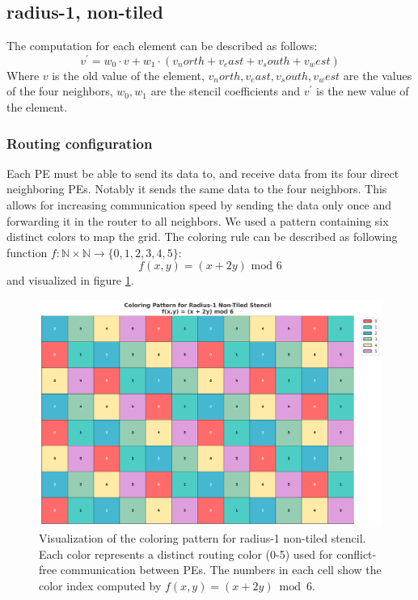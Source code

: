 \documentclass{article}
\newcommand{\m}{\text{ mod }}
\begin{document}
\subsection{radius-1, non-tiled}
The computation for each element can be described as follows:
\begin{equation}
    \label{eq:stencil_computation}
    v^' = w_0 \cdot v + w_1 \cdot (v_north + v_east + v_south + v_west)
\end{equation}
Where $v$ is the old value of the element, $v_north, v_east, v_south, v_west$ are the values of the four neighbors, $w_0, w_1$ are the stencil coefficients and $v^'$ is the new value of the element.

\subsubsection{Routing configuration}
Each PE must be able to send its data to, and receive data from its four direct neighboring PEs. Notably it sends the same data to the four neighbors. This allows for increasing communication speed by sending the data only once and forwarding it in the router to all neighbors. We used a pattern containing six distinct colors to map the grid.
The coloring rule can be described as following function $f:\mathbb{N}\times\mathbb{N}\to\{0,1,2,3,4,5\}$:
\begin{equation}
    \label{eq:coloring_function}
    f(x,y) = (x + 2y) \m 6
\end{equation}
and visualized in figure \ref{fig:r1_stencil_coloring}.
\begin{figure}
    \centering
    \includegraphics[width=0.5\linewidth]{plots/r1-stencil-coloring.png}
    \caption{Visualization of the coloring pattern for radius-1 non-tiled stencil. Each color represents a distinct routing color (0-5) used for conflict-free communication between PEs. The numbers in each cell show the color index computed by $f(x,y) = (x + 2y) \bmod 6$.}
    \label{fig:r1_stencil_coloring}
\end{figure}
\end{document}
